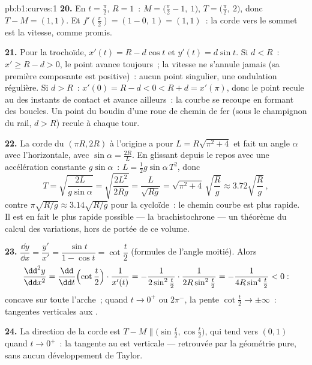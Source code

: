 \begin{solution}{pb:b1:curves:1}
\textbf{20.} En $t = \frac\pi2$, $R = 1$~: $M = \bigl(\frac\pi2 -
1,\ 1\bigr)$, $T = \bigl(\frac\pi2,\ 2\bigr)$, donc $T - M = (1,
1)$. Et $f'(\frac\pi2) = (1 - 0,\ 1) = (1, 1)$~: la corde vers
le sommet est la vitesse, comme promis.

\textbf{21.} Pour la trochoïde, $x'(t) = R - d\cos t$ et $y'(t)
= d\sin t$. Si $d < R$~: $x' \geq R - d > 0$, le point avance
toujours~; la vitesse ne s'annule jamais (sa première composante est
positive)~: aucun point singulier, une ondulation régulière. Si $d > R$~: $x'(0)
= R - d < 0 < R + d = x'(\pi)$, donc le point recule
au  des instants de contact et avance ailleurs~: la courbe
se recoupe en formant des boucles. Un point du boudin d'une roue de
chemin de fer (sous le champignon du rail, $d > R$) recule à chaque
tour.

\textbf{22.} La corde du  $(\pi R, 2R)$ à l'origine
a pour  $L = R\sqrt{\pi^2 + 4}$ et fait un angle $\alpha$ avec
l'horizontale, avec $\sin\alpha = \frac{2R}{L}$. En glissant depuis le repos avec une
accélération constante $g\sin\alpha$~: $L = \frac12 g\sin\alpha\,T^2$, donc
\[
T = \sqrt{\frac{2L}{g\sin\alpha}} = \sqrt{\frac{2L^2}{2Rg}}
= \frac{L}{\sqrt{Rg}} = \sqrt{\pi^2 + 4}\,\sqrt{\frac Rg}
\approx 3.72\sqrt{\frac Rg}\,,
\]
contre $\pi\sqrt{R/g} \approx 3.14\sqrt{R/g}$ pour la cycloïde~:
le chemin courbe est plus rapide. Il est en fait le plus rapide possible
--- la brachistochrone --- un théorème du calcul des
variations, hors de portée de ce volume.

\textbf{23.} $\dfrac{\dd y}{\dd x} = \dfrac{y'}{x'} =
\dfrac{\sin t}{1 - \cos t} = \cot\dfrac t2$ (formules de l'angle
moitié). Alors
\[
\frac{\dd^2y}{\dd x^2}
= \frac{\dd}{\dd t}\Bigl(\cot\frac t2\Bigr)\cdot\frac{1}{x'(t)}
= -\frac{1}{2\sin^2\frac t2}\cdot\frac{1}{2R\sin^2\frac t2}
= -\frac{1}{4R\sin^4\frac t2} < 0 :
\]
concave sur toute l'arche~; quand $t \to 0^+$ ou $2\pi^-$, la
pente $\cot\frac t2 \to \pm\infty$~: tangentes verticales aux
.

\textbf{24.} La direction de la corde est $T - M \parallel
\bigl(\sin\frac t2, \cos\frac t2\bigr)$, qui tend vers $(0, 1)$
quand $t \to 0^{+}$~: la tangente au  est verticale ---
retrouvée par la géométrie pure, sans aucun développement de Taylor.


\end{solution}
